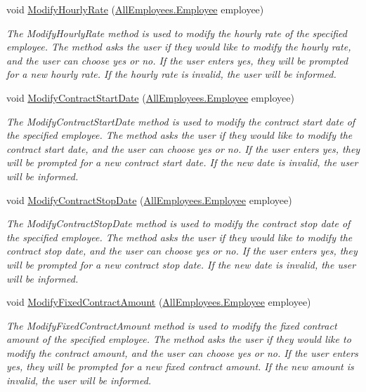 \begin{DoxyCompactItemize}
void \hyperlink{class_the_company_1_1_container_a38b74f7d0fed04956c8b5360e194860b}{Modify\+Hourly\+Rate} (\hyperlink{class_all_employees_1_1_employee}{All\+Employees.\+Employee} employee)
\begin{DoxyCompactList}\small\item\em The Modify\+Hourly\+Rate method is used to modify the hourly rate of the specified employee. The method asks the user if they would like to modify the hourly rate, and the user can choose yes or no. If the user enters yes, they will be prompted for a new hourly rate. If the hourly rate is invalid, the user will be informed. \end{DoxyCompactList}\item 
void \hyperlink{class_the_company_1_1_container_aa631559b361ba4cd6b7499d6e57af5c2}{Modify\+Contract\+Start\+Date} (\hyperlink{class_all_employees_1_1_employee}{All\+Employees.\+Employee} employee)
\begin{DoxyCompactList}\small\item\em The Modify\+Contract\+Start\+Date method is used to modify the contract start date of the specified employee. The method asks the user if they would like to modify the contract start date, and the user can choose yes or no. If the user enters yes, they will be prompted for a new contract start date. If the new date is invalid, the user will be informed. \end{DoxyCompactList}\item 
void \hyperlink{class_the_company_1_1_container_a5966b88fe1b802920e09d984f40454f0}{Modify\+Contract\+Stop\+Date} (\hyperlink{class_all_employees_1_1_employee}{All\+Employees.\+Employee} employee)
\begin{DoxyCompactList}\small\item\em The Modify\+Contract\+Stop\+Date method is used to modify the contract stop date of the specified employee. The method asks the user if they would like to modify the contract stop date, and the user can choose yes or no. If the user enters yes, they will be prompted for a new contract stop date. If the new date is invalid, the user will be informed. \end{DoxyCompactList}\item 
void \hyperlink{class_the_company_1_1_container_aa5548ce6d63db43b96e7002a6b398a64}{Modify\+Fixed\+Contract\+Amount} (\hyperlink{class_all_employees_1_1_employee}{All\+Employees.\+Employee} employee)
\begin{DoxyCompactList}\small\item\em The Modify\+Fixed\+Contract\+Amount method is used to modify the fixed contract amount of the specified employee. The method asks the user if they would like to modify the contract amount, and the user can choose yes or no. If the user enters yes, they will be prompted for a new fixed contract amount. If the new amount is invalid, the user will be informed. \end{DoxyCompactList}\item 

\end{DoxyCompactItemize}
